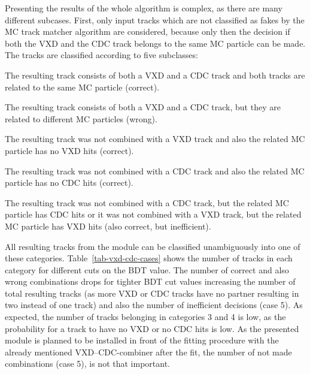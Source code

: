 Presenting the results of the whole algorithm is complex, as there are many different subcases. First, only input tracks which are not classified as fakes by the MC track matcher algorithm are considered, because only then the decision if both the VXD and the CDC track belongs to the same MC particle can be made. The tracks are classified according to five subclasses:
\begin{zlist}
  \item The resulting track consists of both a VXD and a CDC track and both tracks are related to the same MC particle (correct).
  \item The resulting track consists of both a VXD and a CDC track, but they are related to different MC particles (wrong).
  \item The resulting track was not combined with a VXD track and also the related MC particle has no VXD hits (correct).
  \item The resulting track was not combined with a CDC track and also the related MC particle has no CDC hits (correct).
  \item The resulting track was not combined with a CDC track, but the related MC particle has CDC hits or it was not combined with a VXD track, but the related MC particle has VXD hits (also correct, but inefficient).
\end{zlist}

All resulting tracks from the module can be classified unambiguously into one of these categories. Table~\ref{tab-vxd-cdc-cases} shows the number of tracks in each category for different cuts on the BDT value. The number of correct and also wrong combinations drops for tighter BDT cut values increasing the number of total resulting tracks (as more VXD or CDC tracks have no partner resulting in two instead of one track) and also the number of inefficient decisions (case 5). As expected, the number of tracks belonging in categories 3 and 4 is low, as the probability for a track to have no VXD or no CDC hits is low. As the presented module is planned to be installed in front of the fitting procedure with the already mentioned VXD--CDC-combiner after the fit, the number of not made combinations (case 5), is not that important.


